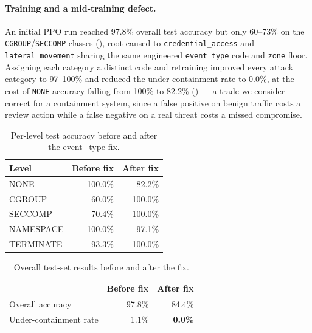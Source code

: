 \documentclass{article}
\begin{document}
\paragraph{Training and a mid-training defect.} An initial PPO run
reached 97.8\% overall test accuracy but only 60--73\% on the
\texttt{CGROUP}/\texttt{SECCOMP} classes (), root-caused
to \texttt{credential\_access} and \texttt{lateral\_movement} sharing
the same engineered \texttt{event\_type} code and \texttt{zone} floor.
Assigning each category a distinct code and retraining improved every
attack category to 97--100\% and reduced the under-containment rate to
0.0\%, at the cost of \texttt{NONE} accuracy falling from 100\% to
82.2\% () --- a trade we consider correct for a
containment system, since a false positive on benign traffic costs a
review action while a false negative on a real threat costs a missed
compromise.

\begin{table}[h]
\centering
\caption{Per-level test accuracy before and after the event\_type fix.}
\label{tab:run1}
\begin{tabular}{lrr}
\toprule
Level & Before fix & After fix \\
\midrule
NONE & 100.0\% & 82.2\% \\
CGROUP & 60.0\% & 100.0\% \\
SECCOMP & 70.4\% & 100.0\% \\
NAMESPACE & 100.0\% & 97.1\% \\
TERMINATE & 93.3\% & 100.0\% \\
\bottomrule
\end{tabular}
\end{table}

\begin{table}[h]
\centering
\caption{Overall test-set results before and after the fix.}
\label{tab:run2}
\begin{tabular}{lrr}
\toprule
& Before fix & After fix \\
\midrule
Overall accuracy & 97.8\% & 84.4\% \\
Under-containment rate & 1.1\% & \textbf{0.0\%} \\
\bottomrule
\end{tabular}
\end{table}
\end{document}

